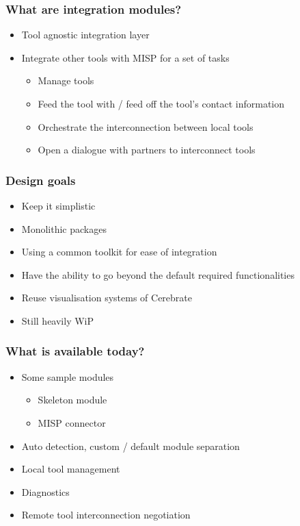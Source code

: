 \begin{frame}
	\frametitle{What are integration modules?}
	\begin{itemize}
                \item Tool agnostic integration layer
                \item Integrate other tools with MISP for a set of tasks
         	\begin{itemize}
		        \item Manage tools
		        \item Feed the tool with / feed off the tool's contact information
                        \item Orchestrate the interconnection between local tools
                        \item Open a dialogue with partners to interconnect tools
		\end{itemize}
	\end{itemize}
\end{frame}

\begin{frame}
	\frametitle{Design goals}
	\begin{itemize}
                \item Keep it simplistic
                \item Monolithic packages
                \item Using a common toolkit for ease of integration
                \item Have the ability to go beyond the default required functionalities
                \item Reuse visualisation systems of Cerebrate
                \item Still heavily WiP
	\end{itemize}
\end{frame}

\begin{frame}
	\frametitle{What is available today?}
	\begin{itemize}
                \item Some sample modules
                \begin{itemize}
                    \item Skeleton module
                    \item MISP connector
                \end{itemize}
                \item Auto detection, custom / default module separation
                \item Local tool management
                \item Diagnostics
                \item Remote tool interconnection negotiation
	\end{itemize}
\end{frame}

